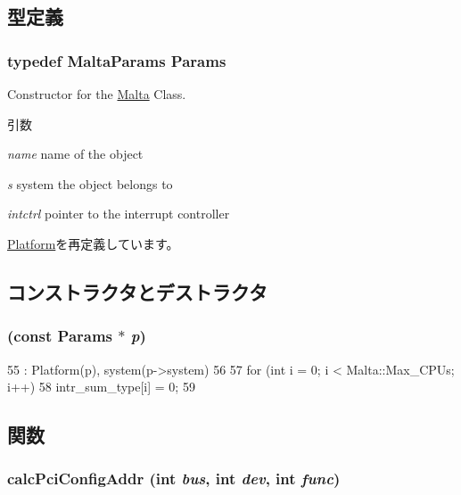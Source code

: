 \subsection{型定義}
\hypertarget{classMalta_a189ad6fd96fd77d2ea4e32ba0a9e5298}{
\subsubsection[{Params}]{\setlength{\rightskip}{0pt plus 5cm}typedef MaltaParams {\bf Params}}}
\label{classMalta_a189ad6fd96fd77d2ea4e32ba0a9e5298}
Constructor for the \hyperlink{classMalta}{Malta} Class. 
\begin{DoxyParams}{引数}
\item[{\em name}]name of the object \item[{\em s}]system the object belongs to \item[{\em intctrl}]pointer to the interrupt controller \end{DoxyParams}


\hyperlink{classPlatform_af4e77eaf2602e4808deef7d1ba95e579}{Platform}を再定義しています。

\subsection{コンストラクタとデストラクタ}
\hypertarget{classMalta_a737e6039fde9f614aee1026aa86405fb}{
\subsubsection[{Malta}]{ (const {\bf Params} $\ast$ {\em p})}}
\label{classMalta_a737e6039fde9f614aee1026aa86405fb}



\begin{DoxyCode}
55     : Platform(p), system(p->system)
56 {
57     for (int i = 0; i < Malta::Max_CPUs; i++)
58         intr_sum_type[i] = 0;
59 }
\end{DoxyCode}


\subsection{関数}
\hypertarget{classMalta_a5b8797a83289cb5fd895c9a5dc7eae6f}{
\subsubsection[{calcPciConfigAddr}]{ calcPciConfigAddr (int {\em bus}, \/  int {\em dev}, \/  int {\em func})}}
\label{classMalta_a5b8797a83289cb5fd895c9a5dc7eae6f}


